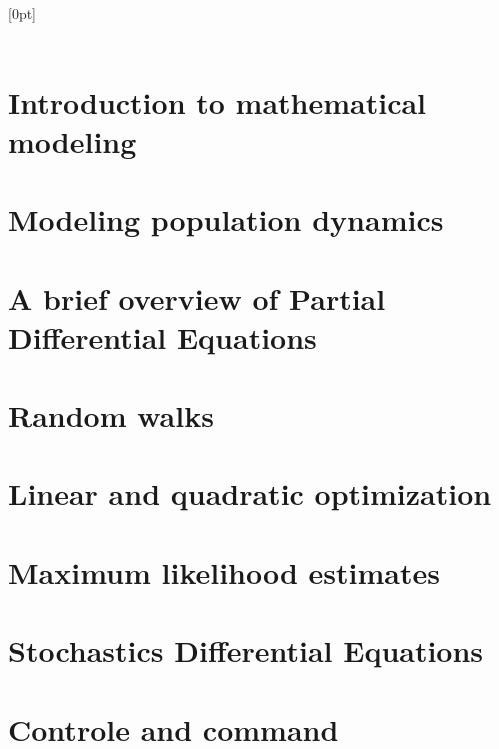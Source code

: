 \documentclass[11pt,twoside,titlepage]{book}
\makeatletter
\newcommand{\tableofcontents@hook}{}
\renewcommand\tableofcontents{%
    \if@twocolumn
      \@restonecoltrue\onecolumn
    \else
      \@restonecolfalse
    \fi
    \chapter*{\contentsname
        \@mkboth{%
           \MakeUppercase\contentsname}{\MakeUppercase\contentsname}}%
    \tableofcontents@hook
    \@starttoc{toc}%
    \if@restonecol\twocolumn\fi
    }
\theoremstyle{plain}
\makeatother
\begin{document}
\dominitoc
\tableofcontents




\mainmatter
\pagestyle{fancy}


  [0pt]%
  {~\\}%
  {\bfseries\chaptername\ \thecontentslabel \quad}%
  {}%
  {\bfseries\hfill\contentspage}%



\newpage
\setcounter{chapter}{0}
\chapter{Introduction to mathematical modeling}\label{chap1}


\chapter{Modeling population dynamics}\label{chap2}


\chapter{A brief overview of Partial Differential Equations}\label{chap2bis}

 
\chapter{Random walks}\label{chap3}


\chapter{Linear and quadratic optimization}\label{chap4}

\chapter{Maximum likelihood estimates}\label{chap5}

\chapter{Stochastics Differential Equations}\label{chap6}

\chapter{Controle and command}\label{chap7}
\end{document}
